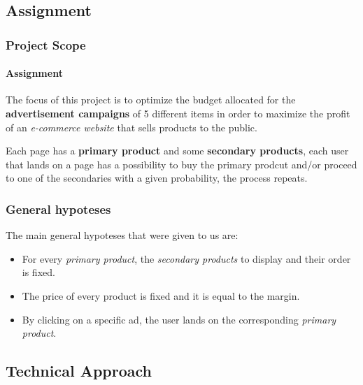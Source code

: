 
\subsection{Assignment}


\begin{frame}

\frametitle{Project Scope}
\framesubtitle{Assignment}

The focus of this project is to optimize the budget allocated for the \textbf{advertisement campaigns} of 5 different items in order to maximize the profit of an \textit{e-commerce website} that sells products to the public.

Each page has a \textbf{primary product} and some \textbf{secondary products}, each user that lands on a page has a possibility to buy the primary prodcut and/or proceed to one of the secondaries with a given probability, the process repeats.

\end{frame}



\begin{frame}

\frametitle{General hypoteses}

The main general hypoteses that were given to us are:
\begin{itemize}[label={-}]
    \item For every \textit{primary product}, the \textit{secondary products} to display and their order is fixed.
    \item The price of every product is fixed and it is equal to the margin.
    \item By clicking on a specific ad, the user lands on the corresponding \textit{primary product}.
\end{itemize}

\end{frame}


\subsection{Technical Approach}


